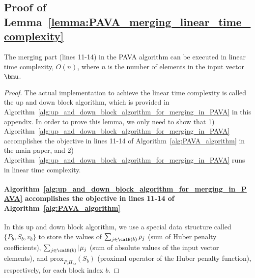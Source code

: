 \subsection{Proof of Lemma~\ref{lemma:PAVA_merging_linear_time_complexity}}

\begin{namedlemma}[~\ref{lemma:PAVA_merging_linear_time_complexity}]
    \label{appendix_lemma:PAVA_merging_linear_time_complexity}
    The merging part (lines 11-14) in the PAVA algorithm can be executed in linear time complexity, $O(n)$, where $n$ is the number of elements in the input vector $\bmu$.
\end{namedlemma}

\begin{proof}
The actual implementation to achieve the linear time complexity is called the up and down block algorithm, which is provided in Algorithm~\ref{alg:up_and_down_block_algorithm_for_merging_in_PAVA} in this appendix.
In order to prove this lemma, we only need to show that 
1) Algorithm~\ref{alg:up_and_down_block_algorithm_for_merging_in_PAVA} accomplishes the objective in lines 11-14 of Algorithm~\ref{alg:PAVA_algorithm} in the main paper, and
2) Algorithm~\ref{alg:up_and_down_block_algorithm_for_merging_in_PAVA} runs in linear time complexity.

\paragraph{Algorithm~\ref{alg:up_and_down_block_algorithm_for_merging_in_PAVA} accomplishes the objective in lines 11-14 of Algorithm~\ref{alg:PAVA_algorithm}}
In this up and down block algorithm, we use a special data structure called $\{P_b, S_b, v_b\}$ to store the values of $\sum_{j \in \calB(b)} \rho_j$ (sum of Huber penalty coefficients), $\sum_{j \in \calB(b)} \vert{\mu_j}$ (sum of absolute values of the input vector elements), and $\text{prox}_{P_b H_{M}}(S_b)$ (proximal operator of the Huber penalty function), respectively, for each block index $b$.


\end{proof}
